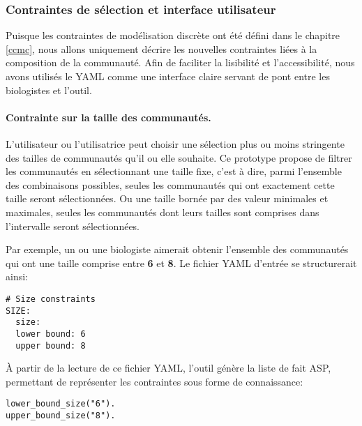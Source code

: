 \documentclass[../main.tex]{subfiles}
\begin{document}
\subsubsection*{Contraintes de sélection et interface utilisateur}
Puisque les contraintes de modélisation discrète ont été défini dans le chapitre \ref{ccmc}, nous allons uniquement décrire les nouvelles contraintes liées à la composition de la communauté.  Afin de faciliter la lisibilité et l'accessibilité, nous avons utilisés le YAML comme une interface claire servant de pont entre les biologistes et l'outil.

\paragraph*{Contrainte sur la taille des communautés.}
L'utilisateur ou l'utilisatrice peut choisir une sélection plus ou moins stringente des tailles de communautés qu'il ou elle souhaite. Ce prototype propose de filtrer les communautés en sélectionnant une taille fixe, c'est à dire, parmi l'ensemble des combinaisons possibles, seules les communautés qui ont exactement cette taille seront sélectionnées. Ou une taille bornée par des valeur minimales et maximales, seules les communautés dont leurs tailles sont comprises dans l'intervalle seront sélectionnées. 


Par exemple, un ou une biologiste aimerait obtenir l'ensemble des communautés qui ont une taille comprise entre \textbf{6} et \textbf{8}. Le fichier YAML d'entrée se structurerait ainsi:

\noindent
\begin{lstlisting}[style=yaml]
# Size constraints
SIZE:
  size: 
  lower bound: 6
  upper bound: 8
\end{lstlisting}

À partir de la lecture de ce fichier YAML, l'outil génère la liste de fait ASP, permettant de représenter les contraintes sous forme de connaissance:\\
\noindent
\begin{lstlisting}
lower_bound_size("6").
upper_bound_size("8").
\end{lstlisting}
 
\end{document}
